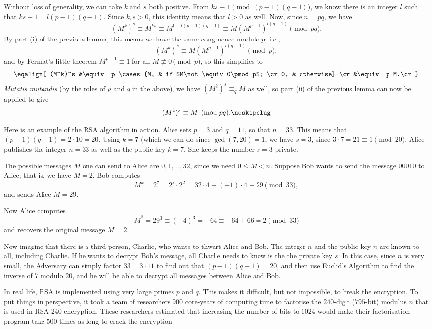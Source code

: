\proof Without loss of generality, we can take $k$ and $s$ both positive. From
$ks\equiv 1\pmod{(p-1)(q-1)}$,
we know there is an integer $l$ such that $ks-1 =l (p-1)(q-1)$. Since $k,s>0$, this identity
means that $l>0$ as well. Now, since $n=pq$, we have
$$(M^k)^s \equiv M^{ks} \equiv M^{1+l(p-1)(q-1)} \equiv M(M^{p-1})^{l(q-1)} \pmod{pq}.$$
By part (i) of the previous lemma, this means we have the same congruence modulo $p$; i.e.,
$$(M^k)^s \equiv M(M^{p-1})^{l(q-1)} \pmod p,$$
and by Fermat's little theorem $M^{p-1}\equiv 1$ for all $M\not\equiv 0\pmod p$, so this simplifies to
$$\eqalign{
(M^k)^s &\equiv_p \cases{M, & if $M\not\equiv 0\pmod p$; \cr 0, & otherwise} \cr
&\equiv_p M.\cr
}$$
{\it Mutatis mutandis} (by the roles of $p$ and $q$ in the above), we have
$(M^k)^s \equiv_q M$ as well, so part (ii) of the previous lemma can now be applied to give
$$(M^k)^s \equiv M \pmod{pq}.\noskipslug$$

Here is an example of the {\mc RSA} algorithm in action. Alice sets $p=3$ and $q=11$,
so that $n=33$. This means that $(p-1)(q-1) = 2\cdot 10 = 20$. Using $k=7$ (which we can
do since $\gcd(7,20) = 1$, we have $s=3$, since $3\cdot 7 = 21\equiv 1\pmod{20}$.
Alice publishes the integer $n=33$ as well as the public key $k=7$. She keeps the number $s=3$ private.

The possible messages $M$ one can send to Alice are $0,1,\ldots, 32$, since we need $0\le M<n$.
Suppose Bob wants to send the message $00010$ to Alice; that is, we have $M=2$. Bob computes
$$M^k = 2^7 = 2^5\cdot 2^2 = 32\cdot 4 \equiv (-1)\cdot 4 \equiv 29\pmod{33},$$
and sends Alice $\bar M = 29$.

Now Alice computes
$$\bar M^s = 29^3 \equiv (-4)^3 = -64 \equiv -64 + 66 = 2\pmod{33}$$
and recovers the original message $M=2$.

Now imagine that there is a third person, Charlie, who wants to thwart Alice and Bob.
The integer $n$ and the public key $n$ are known to all,
including Charlie. If he wants to decrypt Bob's message, all Charlie needs to know is the
the private key $s$. In this case, since $n$ is very small, the Adversary can simply
factor $33 = 3\cdot 11$ to find out that $(p-1)(q-1) = 20$, and then use Euclid's Algorithm
to find the inverse of $7$ modulo $20$, and he will be able to decrypt all messages between
Alice and Bob.

In real life, {\mc RSA} is implemented using very large primes $p$ and $q$.
This makes it difficult, but not impossible, to break the encryption. To put things
in perspective, it took a team of researchers $900$ core-years of computing time to
factorise the $240$-digit ($795$-bit) modulus $n$ that is used
 in {\mc RSA}-240 encryption. These researchers estimated
that increasing the number of bits to $1024$ would make their factorisation program
take $500$ times as long to crack the encryption.

